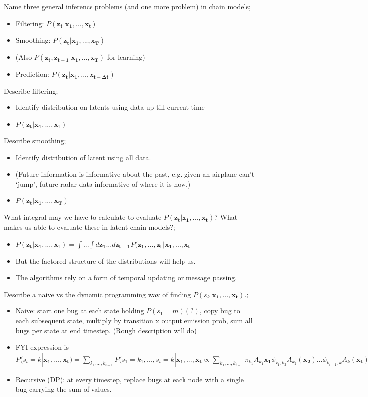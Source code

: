 \documentclass{article}
\begin{document}
Name three general inference problems (and one more problem) in chain models; \begin{itemize} \item Filtering: $P(\mathbf{z_t|x_1,...,x_t})$ \item Smoothing: $P(\mathbf{z_t|x_1,...,x_T})$  \item (Also $P(\mathbf{z_t, z_{t-1}|x_1,...,x_T})$ for learning) \item Prediction: $P(\mathbf{z_t|x_1,...,x_{t-\Delta t}})$ \end{itemize}

Describe filtering; \begin{itemize} \item Identify distribution on latents using data up till current time \item  $P(\mathbf{z_t|x_1,...,x_t})$ \end{itemize}

Describe smoothing; \begin{itemize} \item Identify distribution of latent using all data. \item (Future information is informative about the past, e.g. given an airplane can't `jump', future radar data informative of where it is now.) \item $P(\mathbf{z_t|x_1,...,x_T})$ \end{itemize}

What integral may we have to calculate to evaluate $P(\mathbf{z_t|x_1,...,x_t})$? What makes us able to evaluate these in latent chain models?; \begin{itemize} \item $P(\mathbf{z_t|x_1,...,x_t}) = \int ...\int d\mathbf{z_1}...d\mathbf{z_{t-1}}P(\mathbf{z_1},...,\mathbf{z_t}|\mathbf{x_1},...,\mathbf{x_t}$ \item But the factored structure of the distributions will help us. \item The algorithms rely on a form of temporal updating or message passing. \end{itemize}

Describe a naive vs the dynamic programming way of finding $P(s_k|\mathbf{x_1,...,x_t})$.; \begin{itemize} \item Naive: start one bug at each state holding $P(s_1=m)(?)$, copy bug to each subsequent state, multiply by transition x output emission prob, sum all bugs per state at end timestep. (Rough description will do) \item FYI expression is $P(s_t=k|\mathbf{x_1,...,x_t})=\sum_{k_1, ..., k_{t-1}}P(s_1=k_1,...,s_t=k|\mathbf{x_1,...,x_t}\propto\sum_{k_1,...,k_{t-1}}\pi_{k_1}A_{k_1}\mathbf{x_1}\phi_{k_1,k_2}A_{k_2}(\mathbf{x_2})...\phi_{k_{t-1},k}A_k(\mathbf{x_t})$ \item Recursive (DP): at every timestep, replace bugs at each node with a single bug carrying the sum of values. \end{itemize}
\end{document}
